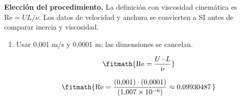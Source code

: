 \noindent\textbf{Elección del procedimiento.} La definición con viscosidad cinemática es $\mathrm{Re}=UL/\nu$. Los datos de velocidad y anchura se convierten a SI antes de comparar inercia y viscosidad.

\begin{enumerate}

\item Usar 0,001 m/s y 0,0001 m; las dimensiones se cancelan.

\[\fitmath{\mathrm{Re}=\frac{U\cdot L}{\nu}}\]

\[\fitmath{\mathrm{Re}=\frac{(0{,}001)\cdot (0{,}0001)}{(1{,}007\times10^{-6})}\approx 0{,}09930487\,}\]

\end{enumerate}
